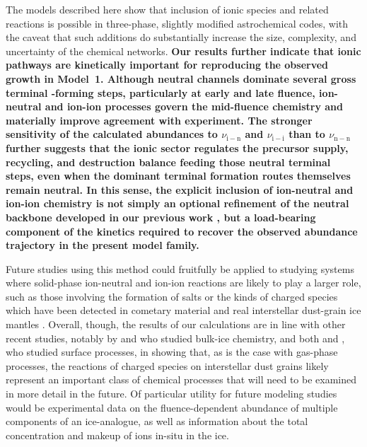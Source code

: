 \documentclass[journal=aesccq,manuscript=article,layout=twocolumn]{achemso}
\DeclareRobustCommand{\cb}[1]{\textbf{\textcolor{codexblue}{#1}}}
\begin{document}
The models described here show that inclusion of ionic species and related reactions is possible in three-phase, slightly modified astrochemical codes, with the caveat that such additions do substantially increase the size, complexity, and uncertainty of the chemical networks. \cb{Our results further indicate that ionic pathways are kinetically important for reproducing the observed \ce{O3} growth in Model~1. Although neutral channels dominate several gross terminal \ce{O3}-forming steps, particularly at early and late fluence, ion-neutral and ion-ion processes govern the mid-fluence chemistry and materially improve agreement with experiment. The stronger sensitivity of the calculated abundances to $\nu_\mathrm{i-n}$ and $\nu_\mathrm{i-i}$ than to $\nu_\mathrm{n-n}$ further suggests that the ionic sector regulates the precursor supply, recycling, and destruction balance feeding those neutral terminal steps, even when the dominant terminal formation routes themselves remain neutral. In this sense, the explicit inclusion of ion-neutral and ion-ion chemistry is not simply an optional refinement of the neutral backbone developed in our previous work \citep{mullikin_condensed-phase_2018,shingledecker_simulating_2019}, but a load-bearing component of the kinetics required to recover the observed \ce{O3} abundance trajectory in the present model family.}

Future studies using this method could fruitfully be applied to studying systems where solid-phase ion-neutral and ion-ion reactions are likely to play a larger role, such as those involving the formation of salts or the kinds of charged species which have been detected in cometary material \citep{altwegg_evidence_2020} and real interstellar dust-grain ice mantles \citep{mcclure_ice_2023,yang_corinos_2022}. Overall, though, the results of our calculations are in line with other recent studies, notably by \citet{woon_ion-ice_2011} and \citet{woon_formation_2024} who studied bulk-ice chemistry, and both \citet{nakai_methanol_2023} and \citet{cui_exploring_2024}, who studied surface processes, in showing that, as is the case with gas-phase processes, the reactions of charged species on interstellar dust grains likely represent an important class of chemical processes that will need to be examined in more detail in the future. Of particular utility for future modeling studies would be experimental data on the fluence-dependent abundance of multiple components of an ice-analogue, as well as information about the total concentration and makeup of ions in-situ in the ice. 
\end{document}
